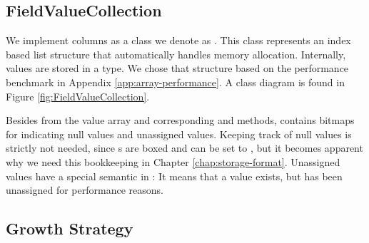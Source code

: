 



\subsection{FieldValueCollection}
\label{sub:FieldValueCollection}

We implement columns as a class we denote as . This class represents an index based list structure that automatically handles memory allocation. Internally, values are stored in a  type. We chose that structure based on the performance benchmark in Appendix \ref{app:array-performance}. A class diagram is found in Figure \ref{fig:FieldValueCollection}. 

Besides from the value array and corresponding  and  methods,  contains bitmaps for indicating null values and unassigned values. Keeping track of null values is strictly not needed, since s are boxed and can be set to \nil, but it becomes apparent why we need this bookkeeping in Chapter \ref{chap:storage-format}. Unassigned values have a special semantic in \gap: It means that a value exists, but has been unassigned for performance reasons. 

\subsection{Growth Strategy}
\label{sub:Growth Strategy}

